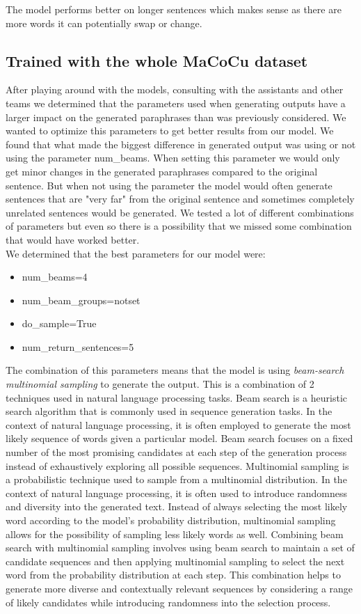 \documentclass[fleqn,moreauthors,10pt]{ds_report}
\begin{document}
The model performs better on longer sentences which makes sense as there are more words it can potentially swap or change. 

\subsection{Trained with the whole MaCoCu dataset}

After playing around with the models, consulting with the assistants and other teams we determined that the parameters used when generating outputs have a larger impact on the generated paraphrases than was previously considered. We wanted to optimize this parameters to get better results from our model. We found that what made the biggest difference in generated output was using or not using the parameter num\_beams. When setting this parameter we would only get minor changes in the generated paraphrases compared to the original sentence. But when not using the parameter the model would often generate sentences that are "very far" from the original sentence and sometimes completely unrelated sentences would be generated. We tested a lot of different combinations of parameters but even so there is a possibility that we missed some combination that would have worked better.\\

We determined that the best parameters for our model were: 
\begin{itemize}
    \item num\_beams=4
    \item num\_beam\_groups=notset
    \item do\_sample=True
    \item num\_return\_sentences=5
\end{itemize}

The combination of this parameters means that the model is using \textit{beam-search multinomial sampling} to generate the output. This is a combination of 2 techniques used in natural language processing tasks. Beam search is a heuristic search algorithm that is commonly used in sequence generation tasks. In the context of natural language processing, it is often employed to generate the most likely sequence of words given a particular model. Beam search focuses on a fixed number of the most promising candidates at each step of the generation process instead of exhaustively exploring all possible sequences. Multinomial sampling is a probabilistic technique used to sample from a multinomial distribution. In the context of natural language processing, it is often used to introduce randomness and diversity into the generated text. Instead of always selecting the most likely word according to the model's probability distribution, multinomial sampling allows for the possibility of sampling less likely words as well. Combining beam search with multinomial sampling involves using beam search to maintain a set of candidate sequences and then applying multinomial sampling to select the next word from the probability distribution at each step. This combination helps to generate more diverse and contextually relevant sequences by considering a range of likely candidates while introducing randomness into the selection process.\\
\end{document}
